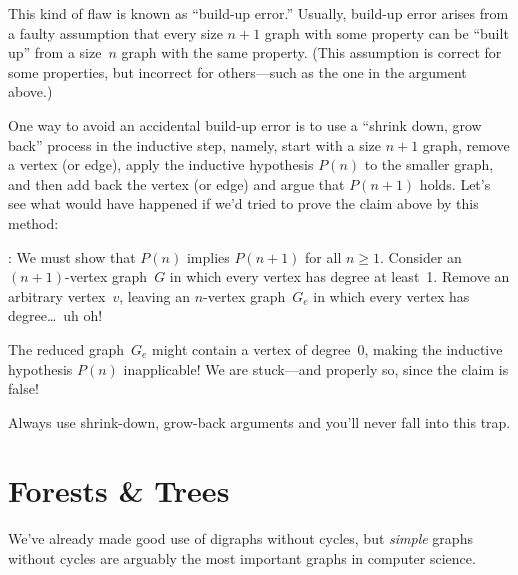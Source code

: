 This kind of flaw is known as ``build-up error.''  Usually, build-up
error arises from a faulty assumption that every size $n + 1$ graph
with some property can be ``built up'' from a size~$n$ graph with the
same property.  (This assumption is correct for some properties, but
incorrect for others---such as the one in the argument above.)

One way to avoid an accidental build-up error is to use a ``shrink
down, grow back'' process in the inductive step, namely, start with a
size $n+1$ graph, remove a vertex (or edge), apply the inductive
hypothesis $P(n)$ to the smaller graph, and then add back the vertex
(or edge) and argue that $P(n + 1)$ holds.  Let's see what would have
happened if we'd tried to prove the claim above by this method:

: We must show that $P(n)$
implies $P(n + 1)$ for all $n \ge 1$.  Consider an $(n + 1)$-vertex
graph~$G$ in which every vertex has degree at least~1.  Remove an
arbitrary vertex~$v$, leaving an $n$-vertex graph~$G_e$ in which every
vertex has degree\dots\ uh oh!

The reduced graph~$G_e$ might contain a vertex of degree~0, making the
inductive hypothesis $P(n)$ inapplicable!  We are stuck---and
properly so, since the claim is false!

Always use shrink-down, grow-back arguments and you'll never fall into
this trap.


\fi

\begin{problems}
\classproblems
{}

\homeworkproblems
{}

\examproblems
{}
\end{problems}

\section{Forests \& Trees}\label{trees-sec}
We've already made good use of digraphs without cycles, but
\emph{simple} graphs without cycles are arguably the most important
graphs in computer science.

